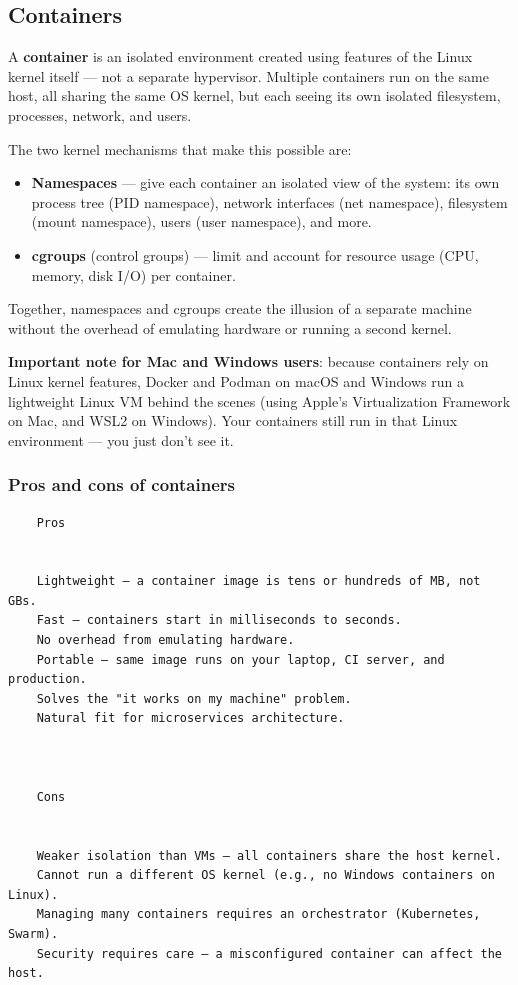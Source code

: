 \documentclass[11pt,american,a4paper,openany]{book}
\renewenvironment{quote}{\begin{quoteblock}}{\end{quoteblock}}
\providecommand{\tightlist}{%
  \setlength{\itemsep}{2pt}\setlength{\parskip}{0pt}}
\begin{document}
\subsection{Containers}\label{containers}

A \textbf{container} is an isolated environment created using features
of the Linux kernel itself --- not a separate hypervisor. Multiple
containers run on the same host, all sharing the same OS kernel, but
each seeing its own isolated filesystem, processes, network, and users.

The two kernel mechanisms that make this possible are:

\begin{itemize}
\tightlist
\item
  \textbf{Namespaces} --- give each container an isolated view of the
  system: its own process tree (PID namespace), network interfaces (net
  namespace), filesystem (mount namespace), users (user namespace), and
  more.
\item
  \textbf{cgroups} (control groups) --- limit and account for resource
  usage (CPU, memory, disk I/O) per container.
\end{itemize}

Together, namespaces and cgroups create the illusion of a separate
machine without the overhead of emulating hardware or running a second
kernel.

\begin{quote}
\textbf{Important note for Mac and Windows users}: because containers
rely on Linux kernel features, Docker and Podman on macOS and Windows
run a lightweight Linux VM behind the scenes (using Apple's
Virtualization Framework on Mac, and WSL2 on Windows). Your containers
still run in that Linux environment --- you just don't see it.
\end{quote}

\subsubsection{Pros and cons of
containers}\label{pros-and-cons-of-containers}

\begin{verbatim}
    Pros
  
  
    Lightweight — a container image is tens or hundreds of MB, not GBs.
    Fast — containers start in milliseconds to seconds.
    No overhead from emulating hardware.
    Portable — same image runs on your laptop, CI server, and production.
    Solves the "it works on my machine" problem.
    Natural fit for microservices architecture.
  


    Cons
  
  
    Weaker isolation than VMs — all containers share the host kernel.
    Cannot run a different OS kernel (e.g., no Windows containers on Linux).
    Managing many containers requires an orchestrator (Kubernetes, Swarm).
    Security requires care — a misconfigured container can affect the host.
  
\end{verbatim}
\end{document}
